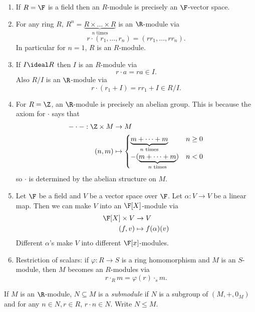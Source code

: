 \documentclass[a4paper]{article}
\theoremstyle{definition}
\begin{document}
\begin{eg}\leavevmode
  \begin{enumerate}
  \item If \(R = \F\) is a field then an \(R\)-module is precisely an \(\F\)-vector space.
  \item For any ring \(R\), \(R^n = \underbrace{R \times \dots \times R}_{n \text{ times}}\) is an \(\R\)-module via
    \[
      r \cdot (r_1, \dots, r_n) = (rr_1, \dots, rr_n).
    \]
    In particular for \(n = 1\), \(R\) is an \(R\)-module.
  \item If \(I \ideal R\) then \(I\) is an \(R\)-module via
    \[
      r \cdot a = ra \in I.
    \]
    Also \(R/I\) is an \(\R\)-module via
    \[
      r \cdot (r_1 + I) = rr_1 + I \in R/I.
    \]
  \item For \(R = \Z\), an \(\R\)-module is precisely an abelian group. This is because the axiom for \(\cdot\) says that
    \begin{align*}
      - \cdot -: \Z \times M &\to M \\
      (n, m) &\mapsto
               \begin{cases}
                 \underbrace{m + \dots + m}_{n \text{ times}} & n \geq 0 \\
                 -(\underbrace{m + \dots + m}_{n \text{ times}}) & n < 0 \\
               \end{cases}
    \end{align*}
    so \(\cdot\) is determined by the abelian structure on \(M\).
  \item Let \(\F\) be a field and \(V\) be a vector space over \(\F\). Let \(\alpha: V \to V\) be a linear map. Then we can make \(V\) into an \(\F[X]\)-module via
    \begin{align*}
      \F[X] \times V &\to V \\
      (f, v) &\mapsto f(\alpha)(v)
    \end{align*}
    Different \(\alpha\)'s make \(V\) into different \(\F[x]\)-modules.
  \item Restriction of scalars: if \(\varphi: R \to S\) is a ring homomorphism and \(M\) is an \(S\)-module, then \(M\) becomes an \(R\)-modules via
    \[
      r \cdot_R m = \varphi(r) \cdot_s m.
    \]
  \end{enumerate}
\end{eg}

\begin{definition}[Submodule]
  If \(M\) is an \(\R\)-module, \(N \subseteq M\) is a \emph{submodule} if \(N\) is a subgroup of \((M, +, 0_M)\) and for any \(n \in N, r \in R\), \(r \cdot n \in N\). Write \(N \leq M\).
\end{definition}
\end{document}
